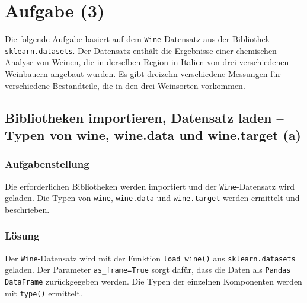 
\chapter{Aufgabe (3)}
\label{chap:Aufgabe3}
\thispagestyle{fancy}

Die folgende Aufgabe basiert auf dem \texttt{Wine}-Datensatz aus der Bibliothek \texttt{sklearn.datasets}. Der Datensatz enthält die Ergebnisse einer chemischen Analyse von Weinen, die in derselben Region in Italien von drei verschiedenen Weinbauern angebaut wurden. Es gibt dreizehn verschiedene Messungen für verschiedene Bestandteile, die in den drei Weinsorten vorkommen.


\section{Bibliotheken importieren, Datensatz laden – Typen von wine, wine.data und wine.target (a)}
\label{sec:3a}

\subsection{Aufgabenstellung}

Die erforderlichen Bibliotheken werden importiert und der \texttt{Wine}-Datensatz wird geladen. Die Typen von \texttt{wine}, \texttt{wine.data} und \texttt{wine.target} werden ermittelt und beschrieben.

\subsection{Lösung}

Der \texttt{Wine}-Datensatz wird mit der Funktion \texttt{load\_wine()} aus \texttt{sklearn.datasets} geladen. Der Parameter \texttt{as\_frame=True} sorgt dafür, dass die Daten als \texttt{Pandas DataFrame} zurückgegeben werden. Die Typen der einzelnen Komponenten werden mit \texttt{type()} ermittelt.



